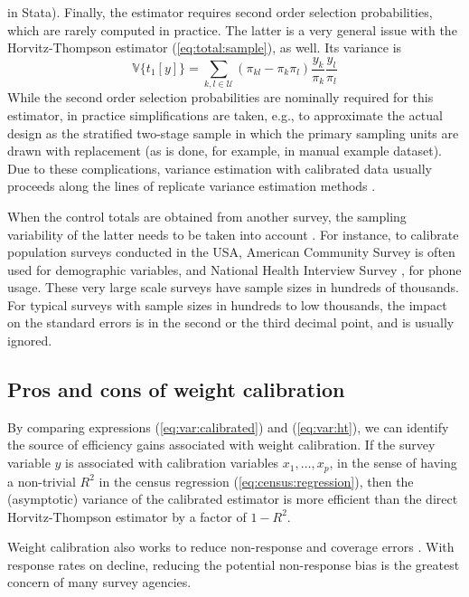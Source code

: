 in Stata). Finally, the estimator requires second order selection probabilities,
which are rarely computed in practice. The latter is a very general issue
with the Horvitz-Thompson estimator (\ref{eq:total:sample}), as well.
Its variance is
\begin{equation}
    \mathbb{V}\bigl\{t_{1}[y]\bigr\} = \sum_{k,l \in \mathcal{U}}
        (\pi_{kl}-\pi_k \pi_l)
        \frac{y_k}{\pi_k}
        \frac{y_l}{\pi_l}
    \label{eq:var:ht}
\end{equation}
While the second order selection probabilities are nominally required
for this estimator, in practice simplifications are taken, e.g.,
to approximate the actual design as the stratified two-stage sample
in which the primary sampling units are drawn with replacement
(as is done, for example, in  \svyref{} manual example
dataset). Due to these complications, variance estimation with
calibrated data usually proceeds along the lines of
replicate variance estimation methods \citep{shao:1996,kolenikov:2010}.

When the control totals are obtained from another survey,
the sampling variability of the latter needs to be taken
into account \citep{dever:valliant:2010}. For instance,
to calibrate population surveys conducted in the USA,
American Community Survey \citep{acs:2009}
is often used for demographic variables,
and National Health Interview Survey \citep{nhis:2000}, for phone usage.
These very large scale surveys have sample sizes in hundreds of thousands.
For typical surveys with sample sizes in hundreds to low thousands,
the impact on the standard errors is in the second or the third
decimal point, and is usually ignored.


\subsection{Pros and cons of weight calibration}
\label{subsec:pro:con}

By comparing expressions (\ref{eq:var:calibrated}) and
(\ref{eq:var:ht}), we can identify the source of efficiency gains
associated with weight calibration. If the survey variable
$y$ is associated with calibration variables $x_1,\ldots,x_p$,
in the sense of having a non-trivial $R^2$ in the census regression
(\ref{eq:census:regression}),
then the (asymptotic) variance of the calibrated estimator is
more efficient than the direct Horvitz-Thompson estimator
by a factor of $1-R^2$.

Weight calibration also works to reduce non-response
and coverage errors \citep{kott:2006}.
With response rates on decline, reducing the potential
non-response bias is the greatest concern of many survey agencies.

